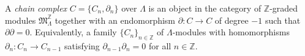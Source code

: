 A \textit{chain complex} $C = \{C_n, \partial_n\}$ over $\Lambda$ is an object in the category of $\mathbb{Z}$-graded modules $\mathfrak{M}_\Lambda^{\mathbb{Z}}$ together with an endomorphism $\partial : C \to C$ of degree $-1$ such that $\partial \partial = 0$. Equivalently, a family $\{C_n\}_{n \in \mathbb{Z}}$ of $\Lambda$-modules with homomorphisms $\partial_n : C_n \to C_{n-1}$ satisfying $\partial_{n-1} \partial_n = 0$ for all $n \in \mathbb{Z}$.